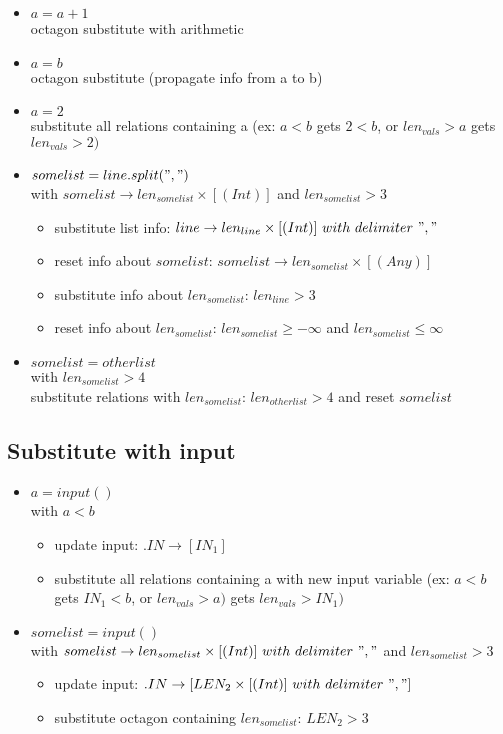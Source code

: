 \documentclass[11pt]{article}
\begin{document}
\begin{itemize}
  \item $a = a + 1$\\
  octagon substitute with arithmetic
  \item $a = b$\\
  octagon substitute (propagate info from a to b)
  \item $a = 2$\\
  substitute all relations containing a (ex: $a < b$ gets $2 < b$, or $len_{vals} > a$ gets $len_{vals} > 2)$
  \item $somelist = line.split(",")$\\ with $somelist \rightarrow len_{somelist} \times [(Int)]$ and $len_{somelist} > 3$
  \begin{itemize}
    \item substitute list info: $line \rightarrow len_{line} \times [(Int)]\ with\ delimiter\ ","$ 
    \item reset info about $somelist$: $somelist \rightarrow len_{somelist} \times [(Any)]$
    \item substitute info about $len_{somelist}$: $len_{line} > 3$
    \item reset info about $len_{somelist}$: $len_{somelist} \geq -\infty$ and $len_{somelist} \leq \infty$
  \end{itemize}
  \item $somelist = otherlist$\\ with $len_{somelist} > 4$\\
  substitute relations with $len_{somelist}$: $len_{otherlist} > 4$ and reset $somelist$
\end{itemize}

\subsection{Substitute with input}

\begin{itemize}
  \item $a = input()$\\ with $a < b$
  \begin{itemize}
    \item update input: $.IN \rightarrow [IN_1]$
    \item substitute all relations containing a with new input variable (ex: $a < b$ gets $IN_1 < b$, or $len_{vals} > a)$ gets $len_{vals} > IN_1)$
  \end{itemize}
  \item $somelist = input()$\\ with $somelist \rightarrow len_{somelist} \times [(Int)]\ with\ delimiter\ ","$ and $len_{somelist} > 3$
  \begin{itemize}
    \item update input: $.IN \rightarrow [LEN_2 \times [(Int)]\ with\ delimiter\ ","]$
    \item substitute octagon containing $len_{somelist}$: $LEN_2 > 3$
  \end{itemize}
\end{itemize}
\end{document}
